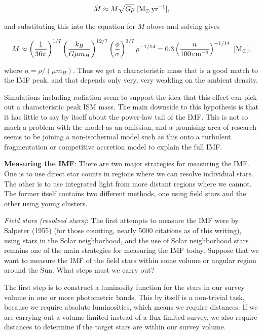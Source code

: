 \documentclass[a4paper,10pt]{article}
\begin{document}
\begin{align*}
    \dot{M}\approx M\sqrt{G\rho} ~ [{\rm M_\odot\,yr^{-1}}],
\end{align*}

{\noindent}and substituting this into the equation for $M$ above and solving gives

\begin{align*}
    M\approx \left(\frac{1}{36\pi}\right)^{1/7} \left(\frac{k_B}{G\mu m_H}\right)^{12/7} \left(\frac{\phi}{\sigma}\right)^{3/7} \rho^{-1/14} = 0.3\left(\frac{n}{100\,{\rm cm^{-3}}}\right)^{-1/14} ~ [{\rm M_\odot}],
\end{align*}

{\noindent}where $n=\rho/(\mu m_H)$. Thus we get a characteristic mass that is a good match to the IMF peak, and that depends only very, very weakling on the ambient density.

{\noindent}Simulations including radiation seem to support the idea that this effect can pick out a characteristic peak ISM mass. The main downside to this hypothesis is that it has little to say by itself about the power-law tail of the IMF. This is not so much a problem with the model as an omission, and a promising area of research seems to be joining a non-isothermal model such as this onto a turbulent fragmentation or competitive accretion model to explain the full IMF.

{\noindent}\textbf{Measuring the IMF}: There are two major strategies for measuring the IMF. One is to use direct star counts in regions where we can resolve individual stars. The other is to use integrated light from more distant regions where we cannot. The former itself contains two different methods, one using field stars and the other using young clusters.

{\noindent}\textit{Field stars (resolved stars)}: The first attempts to measure the IMF were by Salpeter (1955) (for those counting, nearly 5000 citations as of this writing), using stars in the Solar neighborhood, and the use of Solar neighborhood stars remains one of the main strategies for measuring the IMF today. Suppose that we want to measure the IMF of the field stars within some volume or angular region around the Sun. What steps must we carry out?

{\noindent}The first step is to construct a luminosity function for the stars in our survey volume in one or more photometric bands. This by itself is a non-trivial task, because we require absolute luminosities, which means we require distances. If we are carrying out a volume-limited instead of a flux-limited survey, we also require distances to determine if the target stars are within our survey volume.
\end{document}
